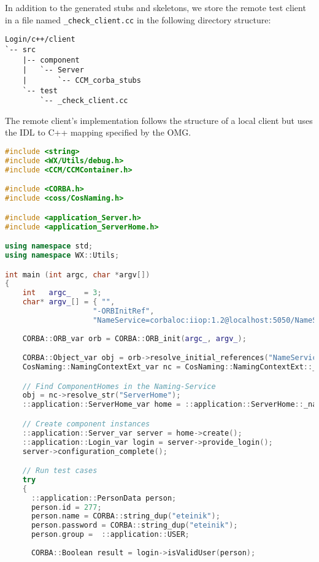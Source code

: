 In addition to the generated stubs and skeletons, we store the remote test
client in a file named {\tt \_check\_client.cc} in the following directory structure:
\begin{footnotesize}
\begin{verbatim}
Login/c++/client
`-- src
    |-- component
    |   `-- Server
    |       `-- CCM_corba_stubs
    `-- test
        `-- _check_client.cc
\end{verbatim}
\end{footnotesize}

The remote client's implementation follows the structure of a local client but
uses the IDL to C++ mapping specified by the OMG.

\begin{footnotesize}
\begin{lstlisting}[language=C++]
#include <string>
#include <WX/Utils/debug.h>
#include <CCM/CCMContainer.h>

#include <CORBA.h>
#include <coss/CosNaming.h>

#include <application_Server.h>
#include <application_ServerHome.h>

using namespace std;
using namespace WX::Utils;

int main (int argc, char *argv[])
{
    int   argc_   = 3;
    char* argv_[] = { "", 
                    "-ORBInitRef", 
                    "NameService=corbaloc:iiop:1.2@localhost:5050/NameService"};
 
    CORBA::ORB_var orb = CORBA::ORB_init(argc_, argv_);

    CORBA::Object_var obj = orb->resolve_initial_references("NameService");
    CosNaming::NamingContextExt_var nc = CosNaming::NamingContextExt::_narrow(obj);

    // Find ComponentHomes in the Naming-Service
    obj = nc->resolve_str("ServerHome");
    ::application::ServerHome_var home = ::application::ServerHome::_narrow(obj);

    // Create component instances
    ::application::Server_var server = home->create();
    ::application::Login_var login = server->provide_login();
    server->configuration_complete();

	// Run test cases
    try 
    {
      ::application::PersonData person;
      person.id = 277;
      person.name = CORBA::string_dup("eteinik");
      person.password = CORBA::string_dup("eteinik");   
      person.group =  ::application::USER;       
      
      CORBA::Boolean result = login->isValidUser(person);
      

\end{lstlisting}
\end{footnotesize}
